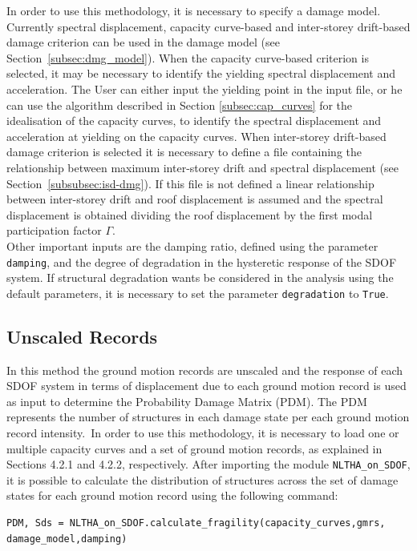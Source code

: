 In order to use this methodology, it is necessary to specify a damage model. Currently spectral displacement, capacity curve-based and inter-storey drift-based damage criterion can be used in the damage model (see Section~\ref{subsec:dmg_model}). When the capacity curve-based criterion is selected, it may be necessary to identify the yielding spectral displacement and acceleration. The User can either input the yielding point in the input file, or he can use the algorithm described in Section \ref{subsec:cap_curves} for the idealisation of the capacity curves, to identify the spectral displacement and acceleration at yielding on the capacity curves. When inter-storey drift-based damage criterion is selected it is necessary to define a file containing the relationship between maximum inter-storey drift and spectral displacement (see Section~\ref{subsubsec:isd-dmg}). If this file is not defined a linear relationship between inter-storey drift and roof displacement is assumed and the spectral displacement is obtained dividing the roof displacement by the first modal participation factor $\Gamma$. \\

Other important inputs are the damping ratio, defined using the parameter \verb=damping=, and the degree of degradation in the hysteretic response of the SDOF system. If structural degradation wants be considered in the analysis using the default parameters, it is necessary to set the parameter \verb=degradation= to \verb=True=.

\subsection{Unscaled Records}
\label{subsec:NLTHA-unscaled}

In this method the ground motion records are unscaled and the response of each SDOF system in terms of displacement due to each ground motion record is used as input to determine the Probability Damage Matrix (PDM). The PDM represents the number of structures in each damage state per each ground motion record intensity.\
In order to use this methodology, it is necessary to load one or multiple capacity curves and a set of ground motion records, as explained in Sections 4.2.1 and 4.2.2, respectively. After importing the module \verb=NLTHA_on_SDOF=, it is possible to calculate the distribution of structures across the set of damage states for each ground motion record using the following command:

\begin{Verbatim}[frame=single, commandchars=\\\{\}, samepage=true]
PDM, Sds = NLTHA_on_SDOF.calculate_fragility(capacity_curves,gmrs,
damage_model,damping)
\end{Verbatim}

